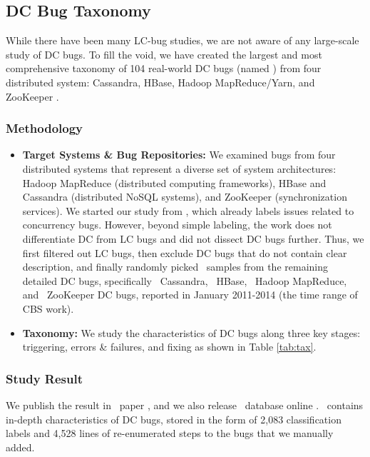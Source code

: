 \subsection{DC Bug Taxonomy}

While there have been many LC-bug studies, we are not aware of any large-scale
study of DC bugs. To fill the void, we have created the largest and most
comprehensive taxonomy of 104 real-world DC bugs (named \taxdc) from four
distributed system: Cassandra, HBase, Hadoop MapReduce/Yarn, and ZooKeeper
\cite{Leesatapornwongsa+16-TaxDC}.

\subsubsection{Methodology}



\begin{itemize}

\item {\bf Target Systems \& Bug Repositories:} We examined bugs from four
distributed systems that represent a diverse set of system architectures: Hadoop
MapReduce \cite{HadoopWeb} (distributed computing frameworks), HBase
\cite{HBaseWeb} and Cassandra \cite{CassandraWeb} (distributed NoSQL systems),
and ZooKeeper \cite{ZooKeeperWeb} (synchronization services).
%
We started our study from \cdb \cite{CBSWeb}, which already labels issues
related to concurrency bugs. However, beyond simple labeling, the \cbs work does
not differentiate DC from LC bugs and did not dissect DC bugs further.
Thus, we first filtered out LC bugs, then exclude DC bugs that do not contain
clear description, and finally randomly picked \numDcBugs\ samples from the
remaining detailed DC bugs, specifically \numDcCA\ Cassandra, \numDcHB\ HBase,
\numDcMR\ Hadoop MapReduce, and \numDcZK\ ZooKeeper DC bugs, reported in January
2011-2014 (the time range of CBS work).  

\item {\bf Taxonomy:} We study the characteristics of DC bugs along three key
stages: triggering, errors \& failures, and fixing as shown in Table \ref{tab:tax}.

\end{itemize}

\subsubsection{Study Result}

We publish the result in \taxdc\ paper \cite{Leesatapornwongsa+16-TaxDC}, and we
also release \taxdc\ database online \cite{TaxDCWeb}.  \taxdc\ contains in-depth
characteristics of DC bugs, stored in the form of 2,083 classification labels
and 4,528 lines of re-enumerated steps to the bugs that we manually added. 


